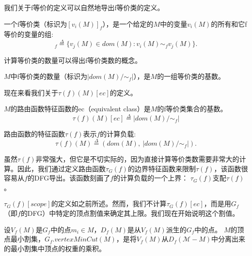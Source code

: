 我们关于f等价的定义可以自然地导出f等价类的定义。 
\begin{definition} 一个f等价类（标识为$[v_i(M)]_f$），是一个给定的$M$中的变量$v_i(M)$的所有和它f等价的变量的组:
\begin{equation*}
[v_i(M)]_f \overset{\Delta}{=} \{v_j(M) \in dom(M) : v_i(M) \sim_f v_j(M)\}.
\end{equation*}
\end{definition}

计算等价类的数量可以得出f等价类数的概念。
 
\begin{definition}
$M$中f等价类的数量（标识为$|dom(M)/\sim_f|$），是$M$的一组等价类的基数。
\end{definition}

现在来看我们关于$\tau(f)(M)[ec]$的定义。

\begin{definition}  $M$的路由函数特征函数的ec（equivalent class）是$M$的f等价类集合的基数。 
\begin{equation*}
\tau(f)(M)[ec] \overset{\Delta}{=} |dom(M)/\sim_f|
\end{equation*}
\end{definition}


\begin{definition} 路由函数的特征函数$\tau(f)$表示$f$的计算负载:
\begin{equation*}
\tau(f)(M) \overset{\Delta}{=} (dom(M),\ |dom(M)/\sim_f|).
\end{equation*}
\end{definition}




虽然$\tau(f)$非常强大，但它是不切实际的，因为直接计算等价类数需要非常大的计算。因此，我们通过定义路由函数$\tau_G(f)$的边界特征函数来限制$\tau(f)$，该函数很容易从$f$的DFG导出。该函数刻画了$f$的计算负载的一个上界： $\tau_G(f)$支配$\tau(f)$。

$\tau_G(f)[scope]$的定义如之前所述。然而，我们不计算$\tau_G(f)[ec]$，而是用$G_f$（即$f$的DFG）中特定的顶点割值来确定其上限。我们现在开始说明这个割值。


\begin{definition} 设$V_f(M)$是$G_f$中的点$m_i \in M$，$D_f(M)$是从$V_f(M)$派生的$G_f$中的点。
    \vspace{2mm}
    $M$的顶点最小割集，$G_f.vertexMinCut(M)$，是将$V_f(M)$从$D_f(\mathcal{M} -M)$中分离出来的最小割集中顶点的权重的乘积。
\end{definition}



